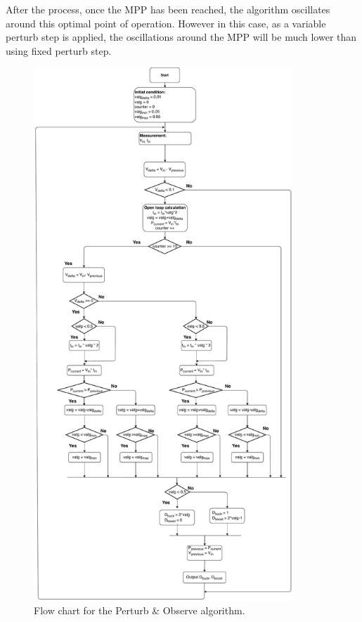 After the process, once the MPP has been reached, the algorithm oscillates around this optimal point of operation. However in this case, as a variable perturb step is applied, the oscillations around the MPP will be much lower than using fixed perturb step.  


\begin{figure}[H]
	\begin{center}
		\includegraphics[width=0.87\textwidth]{../Pictures/P1/Flow_chart/2018_11_29_Flow_chart_MPPT_Buck_Bosst_converter.pdf}
		\caption{Flow chart for the Perturb \& Observe algorithm.}
		\label{fcfinal} 
	\end{center}	
\end{figure}

